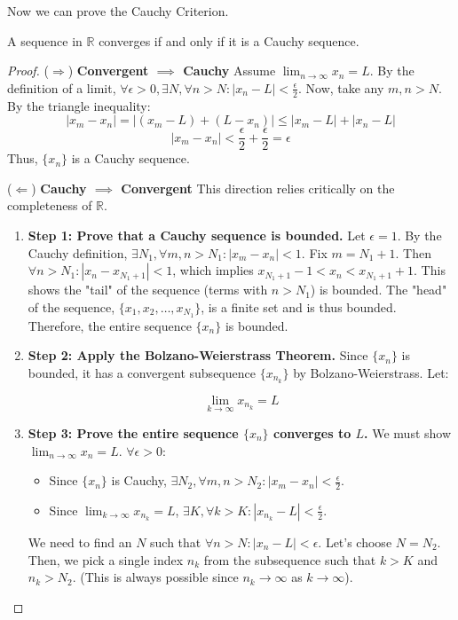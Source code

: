 Now we can prove the Cauchy Criterion.

\begin{theorem}
\label{thm:cauchy_en}
A sequence in $\mathbb{R}$ converges if and only if it is a Cauchy sequence.
\end{theorem}

\begin{proof}
($\Rightarrow$) \textbf{Convergent $\implies$ Cauchy}
Assume $\lim_{n \to \infty} x_n = L$.
By the definition of a limit, $\forall \epsilon > 0, \exists N, \forall n > N: |x_n - L| < \frac{\epsilon}{2}$.
Now, take any $m, n > N$. By the triangle inequality:
\[
|x_m - x_n| = |(x_m - L) + (L - x_n)| \leq |x_m - L| + |x_n - L|
\]
\[
|x_m - x_n| < \frac{\epsilon}{2} + \frac{\epsilon}{2} = \epsilon
\]
Thus, $\{x_n\}$ is a Cauchy sequence.

($\Leftarrow$) \textbf{Cauchy $\implies$ Convergent}
This direction relies critically on the completeness of $\mathbb{R}$.
\begin{enumerate}
    \item \textbf{Step 1: Prove that a Cauchy sequence is bounded.}
    Let $\epsilon = 1$. By the Cauchy definition, $\exists N_1, \forall m, n > N_1: |x_m - x_n| < 1$.
    Fix $m = N_1 + 1$. Then $\forall n > N_1: |x_n - x_{N_1+1}| < 1$, which implies $x_{N_1+1} - 1 < x_n < x_{N_1+1} + 1$.
    This shows the "tail" of the sequence (terms with $n > N_1$) is bounded.
    The "head" of the sequence, $\{x_1, x_2, \dots, x_{N_1}\}$, is a finite set and is thus bounded.
    Therefore, the entire sequence $\{x_n\}$ is bounded.
    
    \item \textbf{Step 2: Apply the Bolzano-Weierstrass Theorem.}
    Since $\{x_n\}$ is bounded, it has a convergent subsequence $\{x_{n_k}\}$ by Bolzano-Weierstrass.
    Let:
    
    $$\lim_{k \to \infty} x_{n_k} = L$$
    
    \item \textbf{Step 3: Prove the entire sequence $\{x_n\}$ converges to $L$.}
    We must show $\lim_{n \to \infty} x_n = L$.
    $\forall \epsilon > 0$:
    \begin{itemize}
        \item Since $\{x_n\}$ is Cauchy, $\exists N_2, \forall m, n > N_2: |x_m - x_n| < \frac{\epsilon}{2}$.
        \item Since $\lim_{k \to \infty} x_{n_k} = L$, $\exists K, \forall k > K: |x_{n_k} - L| < \frac{\epsilon}{2}$.
    \end{itemize}
    We need to find an $N$ such that $\forall n > N: |x_n - L| < \epsilon$.
    Let's choose $N = N_2$. Then, we pick a single index $n_k$ from the subsequence such that $k > K$ and $n_k > N_2$. (This is always possible since $n_k \to \infty$ as $k \to \infty$).
    

\end{enumerate}
\end{proof}
